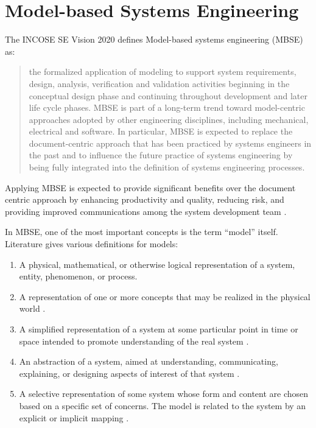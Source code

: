 \section{Model-based Systems Engineering}\label{sec:mbse}

The INCOSE SE Vision 2020 \cite{incose-systems-engineering-2020} defines Model-based systems engineering (MBSE) as:

\blockquote{the formalized application of modeling to support system requirements, design, analysis, verification and validation activities beginning in the conceptual design phase and continuing throughout development and later life cycle phases. MBSE is part of a long-term trend toward model-centric approaches adopted by other engineering disciplines, including mechanical, electrical and software. In particular, MBSE is expected to replace the document-centric approach that has been practiced by systems engineers in the past and to influence the future practice of systems engineering by being fully integrated into the definition of systems engineering processes.}

Applying MBSE is expected to provide significant benefits over the document centric approach by enhancing productivity and quality, reducing risk, and providing improved communications among the system development team \cite{omgwiki}.

In MBSE, one of the most important concepts is the term \enquote{model} itself. Literature gives various definitions for models:

\begin{enumerate}
	\item A physical, mathematical, or otherwise logical representation of a system, entity, phenomenon, or process.\cite{DoD_modeling_and_simulation}\label{item:dod}
	\item A representation of one or more concepts that may be realized in the physical world \cite{sysml_practical_guide}.
	\item A simplified representation of a system at some particular point in time or space intended to promote understanding of the real system \cite{modsim}.
	\item An abstraction of a system, aimed at understanding, communicating, explaining, or designing aspects of interest of that system \cite{object-process-methodology}.
	\item A selective representation of some system whose form and content are chosen based on a specific set of concerns. The model is related to the system by an explicit or implicit mapping \cite{ORMSC/2010-09-06}.
\end{enumerate}

